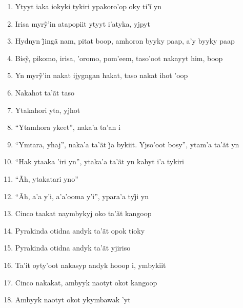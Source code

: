 \begin{enumerate}
 \item Ytyyt iaka iokyki tykiri ypakoro’op oky ti’ĩ yn

 \item Irisa myrỹ’in atapopiit ytyyt i’atyka, yjpyt

 \item Hydnyn j̃ingã nam, pitat boop, amhoron byyky paap, a’y byyky paap

 \item Bisỹ, pikomo, irisa, ’oromo, pom’eem, taso’oot nakayyt him, boop

 \item Yn myrỹ’in nakat ijygngan hakat, taso nakat ihot ’oop

 \item Nakahot ta'ãt taso

 \begin{center}\end{center}

 \item Ytakahori yta, yjhot

 \item ``Ytamhora ykeet'', naka'a ta'an i

 \item ``Ymtara, yhaj'', naka’a ta’ãt j̃a bykiit. Yjso’oot bosy'', ytam’a ta’ãt yn

 \item ``Hak ytaaka 'iri yn'', ytaka'a ta'ãt yn kahyt i'a tykiri

 \item ``Ãh, ytakatari yno''

 \item ``Ãh, a’a y’i, a’a’ooma y’i'', ypara’a tyj̃i yn

 \begin{center}\end{center}

 \item Cinco taakat naymbykyj oko ta'ãt kangoop

 \item Pyrakinda otidna andyk ta'ãt opok tioky

 \item Pyrakinda otidna andyk ta'ãt yjiriso

 \item Ta'it oyty'oot nakasyp andyk hooop i, ymbykiit

 \item Cinco nakakat, ambyyk naotyt okot kangoop

 \item Ambyyk naotyt okot ykymbawak 'yt


\end{enumerate}
